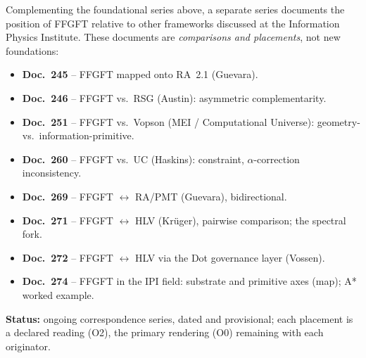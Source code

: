 	Complementing the foundational series above, a separate series documents the position of
	FFGFT relative to other frameworks discussed at the Information Physics Institute. These
	documents are \emph{comparisons and placements}, not new foundations:
	\begin{itemize}
		\item \textbf{Doc.~245} -- FFGFT mapped onto RA~2.1 (Guevara).
		\item \textbf{Doc.~246} -- FFGFT vs.\ RSG (Austin): asymmetric complementarity.
		\item \textbf{Doc.~251} -- FFGFT vs.\ Vopson (MEI / Computational Universe): geometry- vs.\ information-primitive.
		\item \textbf{Doc.~260} -- FFGFT vs.\ UC (Haskins): constraint, $\alpha$-correction inconsistency.
		\item \textbf{Doc.~269} -- FFGFT $\leftrightarrow$ RA/PMT (Guevara), bidirectional.
		\item \textbf{Doc.~271} -- FFGFT $\leftrightarrow$ HLV (Krüger), pairwise comparison; the spectral fork.
		\item \textbf{Doc.~272} -- FFGFT $\leftrightarrow$ HLV via the Dot governance layer (Vossen).
		\item \textbf{Doc.~274} -- FFGFT in the IPI field: substrate and primitive axes (map); A* worked example.
	\end{itemize}
	\textbf{Status:} ongoing correspondence series, dated and provisional; each placement is a
	declared reading (O2), the primary rendering (O0) remaining with each originator.
